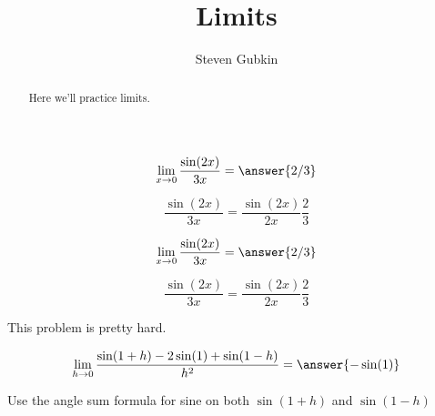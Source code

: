 \documentclass{ximera}
\author{Steven Gubkin}
\title[Exercises:]{Limits}
\begin{document}
\begin{abstract}
  Here we'll practice limits.
\end{abstract}
\maketitle


\begin{exercise}
\[\lim_{x \to 0} \frac{\sin(2x)}{3x} = \answer{2/3}\]
\begin{hint}
	\[\frac{\sin(2x)}{3x} = \frac{\sin(2x)}{2x} \frac{2}{3}\]
\end{hint}
\end{exercise}


\begin{exercise}
\[\lim_{x \to 0} \frac{\sin(2x)}{3x} = \answer{2/3}\]
\begin{hint}
	\[\frac{\sin(2x)}{3x} = \frac{\sin(2x)}{2x} \frac{2}{3}\]
\end{hint}
\end{exercise}



\begin{exercise}
	\begin{warning}
		This problem is pretty hard.
	\end{warning}
	\[\lim_{h \to 0} \frac{\sin(1+h) - 2\sin(1)+\sin(1-h)}{h^2} = \answer{-\sin(1)}\]
	\begin{hint}
		Use the angle sum formula for sine on both $\sin(1+h)$ and $\sin(1-h)$
	\end{hint}
\end{exercise}
\end{document}

